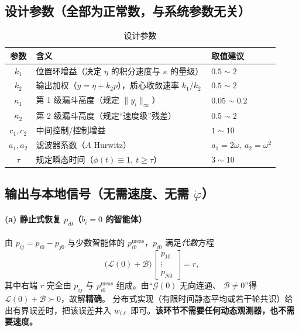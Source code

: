 \documentclass[11pt,a4paper]{article}
\theoremstyle{plain}
\theoremstyle{definition}
\theoremstyle{remark}
\begin{document}
\subsection{设计参数（全部为正常数，与系统参数无关）}\label{sec:params}
\begin{table}[H]
\centering
\caption{设计参数}
\begin{tabular}{c|p{6.5cm}|p{4.6cm}}
\hline
参数 & 含义 & 取值建议\\
\hline
$k_1$ & 位置环增益（决定 $\eta$ 的积分速度与 $\kappa$ 的量级） & $0.5\sim2$\\
$k_2$ & 输出加权（$y=\eta+k_2p$），质心收敛速率 $k_1/k_2$ & $0.5\sim2$\\
$\kappa_1$ & 第 1 级漏斗高度（规定 $\|y_i\|_\infty$） & $0.05\sim0.2$\\
$\kappa_2$ & 第 2 级漏斗高度（规定“速度级”残差） & $0.5\sim2$\\
$c_1,c_2$ & 中间控制/控制增益 & $1\sim10$\\
$a_1,a_2$ & 滤波器系数（$A$ Hurwitz） & $a_1=2\omega,\ a_2=\omega^2$\\
$\tau$ & 规定瞬态时间（$\phi(t)\equiv1,\ t\ge\tau$） & $3\sim10$\\
\hline
\end{tabular}
\end{table}

\subsection{输出与本地信号（无需速度、无需 $\dot\varphi$）}\label{sec:static}

\paragraph{(a) 静止式恢复 $p_{i0}$（$b_i=0$ 的智能体）}
由 $p_{ij}=p_{i0}-p_{j0}$ 与少数智能体的 $p_{i0}^{\mathrm{meas}}$，$p_{i0}$ 满足\emph{代数}方程
\begin{equation*}
\bigl(\mathcal L(0)+\mathcal B\bigr)\begin{bmatrix}p_{10}\\ \vdots\\ p_{N0}\end{bmatrix}=r,
\end{equation*}
其中右端 $r$ 完全由 $p_{ij}$ 与 $p_{i0}^{\mathrm{meas}}$ 组成。由“$\mathcal G(0)$ 无向连通、
$\mathcal B\neq0$”得 $\mathcal L(0)+\mathcal B\succ0$，故解\textbf{精确}。
分布式实现（有限时间静态平均或若干轮共识）给出有界误差时，把该误差并入 $w_{i\ell}$
即可。\textbf{该环节不需要任何动态观测器，也不需要速度。}
\end{document}
